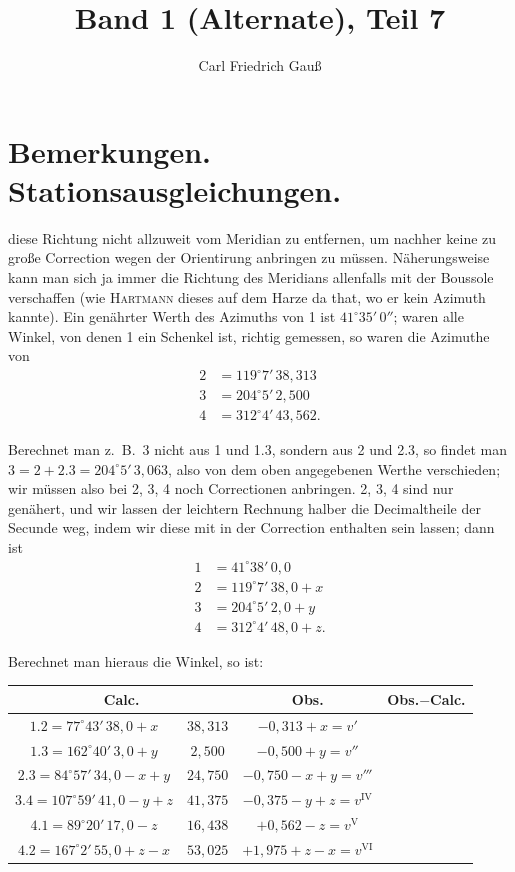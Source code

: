 \documentclass[12pt,a4paper]{article}
\title{Band 1 (Alternate), Teil 7}
\author{Carl Friedrich Gau\ss}
\date{}
\theoremstyle{plain}
\theoremstyle{definition}
\theoremstyle{remark}
\begin{document}
\maketitle

\section*{Bemerkungen. Stationsausgleichungen.}
\label{sec:stationsausgleichungen}

 diese Richtung nicht allzuweit vom Meridian zu entfernen, um nachher keine zu gro\ss{}e Correction wegen der Orientirung anbringen zu m\"ussen. N\"aherungsweise kann man sich ja immer die Richtung des Meridians allenfalls mit der Boussole verschaffen (wie \textsc{Hartmann} dieses auf dem Harze da that, wo er kein Azimuth kannte). Ein gen\"ahrter Werth des Azimuths von 1 ist $41^{\circ}35'\,0''$; waren alle Winkel, von denen 1 ein Schenkel ist, richtig gemessen, so waren die Azimuthe von
\begin{align*}
2 &= 119^{\circ}7'\,38{,}313\tag{a}\\
3 &= 204^{\circ}5'\,2{,}500\\
4 &= 312^{\circ}4'\,43{,}562.
\end{align*}

Berechnet man z.\ B.\ 3 nicht aus 1 und 1.3, sondern aus 2 und 2.3, so findet man $3 = 2 + 2.3 = 204^{\circ}5'\,3{,}063$, also von dem oben angegebenen Werthe verschieden; wir m\"ussen also bei 2, 3, 4 noch Correctionen anbringen. 2, 3, 4 sind nur gen\"ahert, und wir lassen der leichtern Rechnung halber die Decimaltheile der Secunde weg, indem wir diese mit in der Correction enthalten sein lassen; dann ist
\begin{align*}
1 &= 41^{\circ}38'\,0{,}0\tag{a}\\
2 &= 119^{\circ}7'\,38{,}0 + x\\
3 &= 204^{\circ}5'\,2{,}0 + y\\
4 &= 312^{\circ}4'\,48{,}0 + z.
\end{align*}

Berechnet man hieraus die Winkel, so ist:
\begin{center}
\begin{tabular}{c|c|c|c}
\multicolumn{2}{c|}{Calc.} & Obs. & Obs.$-$Calc.\\
\hline
$1.2 = 77^{\circ}43'\,38{,}0 + x$ & $38{,}313$ & $-0{,}313 + x = v'$\\
$1.3 = 162^{\circ}40'\,3{,}0 + y$ & $2{,}500$ & $-0{,}500 + y = v''$\\
$2.3 = 84^{\circ}57'\,34{,}0 - x + y$ & $24{,}750$ & $-0{,}750 - x + y = v'''$\\
$3.4 = 107^{\circ}59'\,41{,}0 - y + z$ & $41{,}375$ & $-0{,}375 - y + z = v^{\mathrm{IV}}$\\
$4.1 = 89^{\circ}20'\,17{,}0 - z$ & $16{,}438$ & $+0{,}562 - z = v^{\mathrm{V}}$\\
$4.2 = 167^{\circ}2'\,55{,}0 + z - x$ & $53{,}025$ & $+1{,}975 + z - x = v^{\mathrm{VI}}$
\end{tabular}
\end{center}
\end{document}
